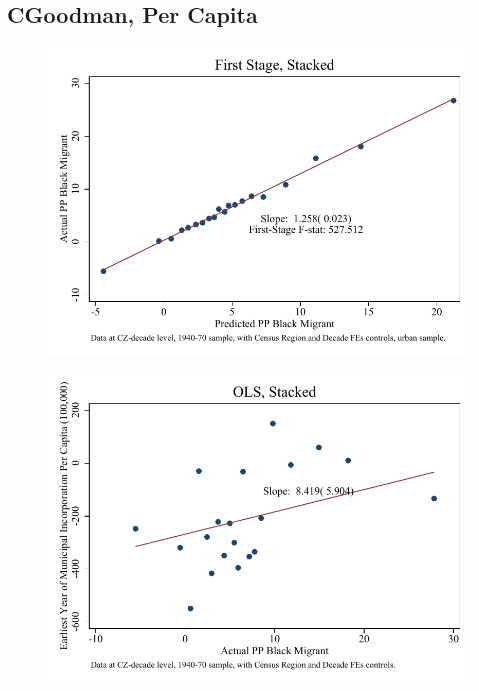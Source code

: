 \documentclass{article}
\begin{document}
\subsection{CGoodman, Per Capita}

\clearpage
\begin{figure}
\centering
\includegraphics{figures/simplefigs/stacked_cgoodman_pc_C3_urban_fs_dc.pdf}
\end{figure}
\clearpage
\begin{figure}
\centering
\includegraphics{figures/simplefigs/stacked_cgoodman_pc_C3_urban_ols_dc.pdf}
\end{figure}
\clearpage
\end{document}
